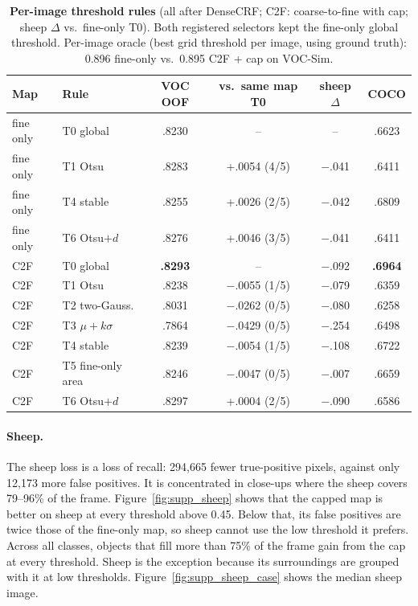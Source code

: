 \begin{table}[t]
\centering
\scriptsize\setlength{\tabcolsep}{2.2pt}
\begin{tabular}{@{}llcccc@{}}
\toprule
Map & Rule & VOC OOF & vs.\ same map T0 & sheep $\Delta$ & COCO \\
\midrule
fine only & T0 global & .8230 & -- & -- & .6623 \\
fine only & T1 Otsu & .8283 & +.0054 (4/5) & $-$.041 & .6411 \\
fine only & T4 stable & .8255 & +.0026 (2/5) & $-$.042 & .6809 \\
fine only & T6 Otsu$+d$ & .8276 & +.0046 (3/5) & $-$.041 & .6411 \\
\midrule
C2F & T0 global & \textbf{.8293} & -- & $-$.092 & \textbf{.6964} \\
C2F & T1 Otsu & .8238 & $-$.0055 (1/5) & $-$.079 & .6359 \\
C2F & T2 two-Gauss. & .8031 & $-$.0262 (0/5) & $-$.080 & .6258 \\
C2F & T3 $\mu{+}k\sigma$ & .7864 & $-$.0429 (0/5) & $-$.254 & .6498 \\
C2F & T4 stable & .8239 & $-$.0054 (1/5) & $-$.108 & .6722 \\
C2F & T5 fine-only area & .8246 & $-$.0047 (0/5) & $-$.007 & .6659 \\
C2F & T6 Otsu$+d$ & .8297 & +.0004 (2/5) & $-$.090 & .6586 \\
\bottomrule
\end{tabular}
\caption{\textbf{Per-image threshold rules} (all after DenseCRF; C2F: coarse-to-fine with cap; sheep $\Delta$ vs.\ fine-only T0). Both registered selectors kept the fine-only global threshold. Per-image oracle (best grid threshold per image, using ground truth): 0.896 fine-only vs.\ 0.895 C2F + cap on VOC-Sim.}
\label{tab:supp_threshold}
\end{table}

\paragraph{Sheep.}
The sheep loss is a loss of recall: 294{,}665 fewer true-positive pixels, against only 12{,}173 more false positives. It is concentrated in close-ups where the sheep covers 79--96\% of the frame. Figure~\ref{fig:supp_sheep} shows that the capped map is better on sheep at every threshold above 0.45. Below that, its false positives are twice those of the fine-only map, so sheep cannot use the low threshold it prefers. Across all classes, objects that fill more than 75\% of the frame gain from the cap at every threshold. Sheep is the exception because its surroundings are grouped with it at low thresholds. Figure~\ref{fig:supp_sheep_case} shows the median sheep image.

